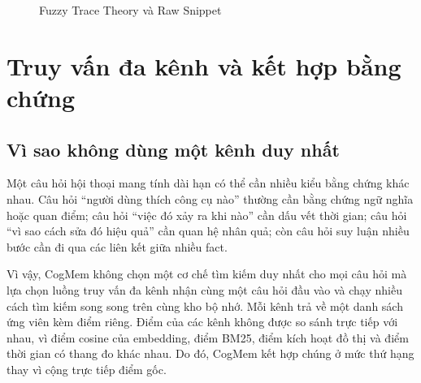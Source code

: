 \documentclass[../main.tex]{subfiles}
\begin{document}
\begin{figure}[H]
\centering
{}
\caption{Fuzzy Trace Theory và Raw Snippet}
\label{fig:ch4_fuzzy_trace}
\end{figure}

\section{Truy vấn đa kênh và kết hợp bằng chứng}
\label{sec:ch3_multichannel_query}

\subsection{Vì sao không dùng một kênh duy nhất}

Một câu hỏi hội thoại mang tính dài hạn có thể cần nhiều kiểu bằng chứng khác nhau. Câu hỏi ``người dùng thích công cụ nào'' thường cần bằng chứng ngữ nghĩa hoặc quan điểm; câu hỏi ``việc đó xảy ra khi nào'' cần dấu vết thời gian; câu hỏi ``vì sao cách sửa đó hiệu quả'' cần quan hệ nhân quả; còn câu hỏi suy luận nhiều bước cần đi qua các liên kết giữa nhiều fact. 

Vì vậy, CogMem không chọn một cơ chế tìm kiếm duy nhất cho mọi câu hỏi mà lựa chọn luồng truy vấn đa kênh nhận cùng một câu hỏi đầu vào và chạy nhiều cách tìm kiếm song song trên cùng kho bộ nhớ. Mỗi kênh trả về một danh sách ứng viên kèm điểm riêng. Điểm của các kênh không được so sánh trực tiếp với nhau, vì điểm cosine của embedding, điểm BM25, điểm kích hoạt đồ thị và điểm thời gian có thang đo khác nhau. Do đó, CogMem kết hợp chúng ở mức thứ hạng thay vì cộng trực tiếp điểm gốc.
\end{document}
